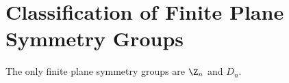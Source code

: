 \section{Classification of Finite Plane Symmetry Groups}

\begin{theorem}
	The only finite plane symmetry groups are $\Z_n$ and $D_n$.
\end{theorem}
